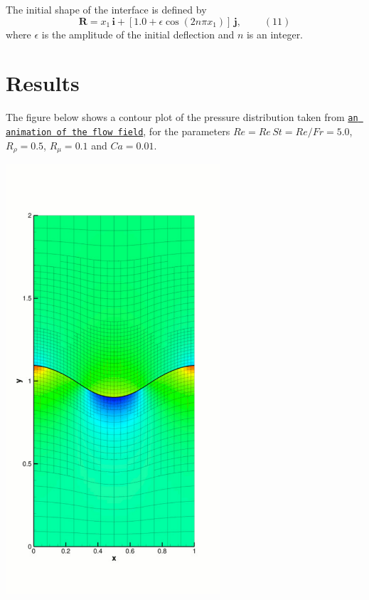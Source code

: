 \begin{center}
\begin{longtabu}
The initial shape of the interface is defined by \[ \mathbf{R} = x_1 \, \mathbf{i} + \left[ 1.0 + \epsilon\cos\left( 2 n \pi x_1 \right)\right] \, \mathbf{j}, \ \ \ \ \ \ \ \ \ \ (11) \] where $ \epsilon $ is the amplitude of the initial deflection and $ n $ is an integer.   \\
\end{longtabu}
\end{center} 



 

\hypertarget{index_results}{}\section{Results}\label{index_results}
The figure below shows a contour plot of the pressure distribution taken from \href{../figures/two_layer_interface.avi}{\tt an animation of the flow field}, for the parameters $ Re = Re \, St = Re/Fr = 5.0 $, $ R_\rho = 0.5 $, $ R_\mu = 0.1 $ and $ Ca = 0.01 $.

 
\begin{DoxyImage}
\includegraphics[width=0.6\textwidth]{two_layer_interface}
\end{DoxyImage}


